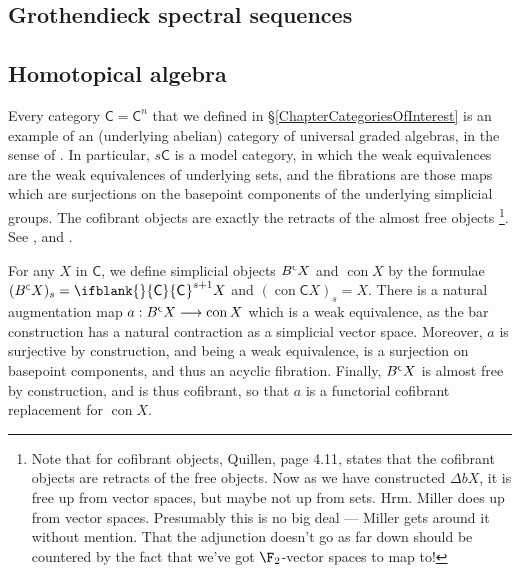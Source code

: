 \documentclass[10pt]{article}
\newcommand{\BarConst}[1]{B^{\smash{\mbox{\tiny $#1$}}}}
\newcommand{\Fr}[2][]{\ifblank{#1}{#2}{#2_{#1}}}
\DeclareMathOperator{\Constant}{con}
\begin{document}
\begin{HomotopicalAlgebra}
\pagebreak
\section{Grothendieck spectral sequences}
\subsection{Homotopical algebra}


Every category $\mathsf{C}=\mathsf{C}^n$ that we defined in \S\ref{ChapterCategoriesOfInterest} is an example of an (underlying abelian) category of universal graded algebras, in the sense of \cite{Blanc_Stover-Groth_SS.pdf}. In particular, $s\mathsf{C}$ is a model category, in which the weak equivalences are the weak equivalences of underlying sets, and the fibrations are those maps which are surjections on the basepoint components of the underlying simplicial groups. The cofibrant objects are exactly the retracts of the almost free objects%
\footnote{Note that for cofibrant objects, Quillen, page 4.11, states that the cofibrant objects are retracts of the free objects. Now as we have constructed $\Delta bX$, it is free up from vector spaces, but maybe not up from sets. Hrm. Miller does up from vector spaces. Presumably this is no big deal --- Miller gets around it without mention. That the adjunction doesn't go as far down should be countered by the fact that we've got $\F_2$-vector spaces to map to!}. See \cite{Blanc_Stover-Groth_SS.pdf}, \cite[II\S4]{QuillenHomAlg.pdf} and \cite[\S3]{MillerSullivanConjecture.pdf}.

For any $X$ in $\mathsf{C}$, we define simplicial objects $\BarConst{\mathsf{C}}X$ and $\Constant X$ by the formulae $(\BarConst{\mathsf{C}}X)_s=\Fr{\mathsf{C}}^{s+1}X$ and $(\Constant{\mathsf{C}}X)_s=X$. There is a natural augmentation map $a:\BarConst{\mathsf{C}}X\to\Constant X$ which is a weak equivalence, as the bar construction has a natural contraction as a simplicial vector space. Moreover, $a$ is surjective by construction, and being a weak equivalence, is a surjection on basepoint components, and thus an acyclic fibration. Finally, $\BarConst{\mathsf{C}}X$ is almost free by construction, and is thus cofibrant, so that $a$ is a functorial cofibrant replacement for $\Constant X$.


\end{HomotopicalAlgebra}
\end{document}
